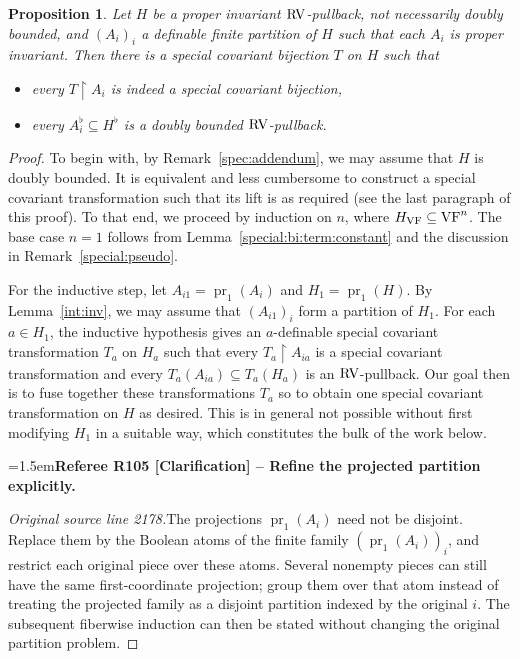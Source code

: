 \documentclass[12pt]{amsart}
\newcommand{\RefereeRemark}[4]{%
  \par\medskip\begingroup\normalfont\small\color{RefereePurple}%
  \emergencystretch=1.5em\noindent\textbf{Referee R#1 [#2] -- #3.}\par\nobreak\noindent #4\par
  \endgroup\medskip
}
\theoremstyle{plain}
\newtheorem{prop}[thm]{Proposition}
\theoremstyle{definition}
\theoremstyle{remark}
\numberwithin{equation}{section}
\theoremstyle{plain}
\newcommand{\VF}{\textup{VF}}
\newcommand{\RV}{\textup{RV}}
\DeclareMathOperator{\pr}{pr}
\newcommand{\0}{\emptyset}
\newcommand{\rest}{\upharpoonright}
\newcommand{\sub}{\subseteq}
\DeclareMathOperator{\rv}{rv}
\begin{document}
\begin{prop}\label{simplex:with:hole:rvproduct}
Let $H$ be a proper invariant $\RV$-pullback, not necessarily doubly bounded, and $(A_i)_i$ a definable finite partition of $H$ such that each $A_i$ is proper invariant. Then there is a special covariant bijection $T$ on $H$ such that
\begin{itemize}
  \item every $T \rest A_i$ is indeed a special covariant bijection,
  \item every $A_i^{\flat} \sub H^{\flat}$  is a doubly bounded $\RV$-pullback.
\end{itemize}
\end{prop}
\begin{proof}
To begin with, by Remark~\ref{spec:addendum}, we may assume that $H$ is doubly bounded. It is equivalent and less cumbersome to construct a special covariant transformation such that its lift is as required (see the last paragraph of this proof). To that end, we proceed by induction on $n$, where $H_{\VF} \sub \VF^n$. The base case $n=1$ follows from Lemma~\ref{special:bi:term:constant} and the discussion in Remark~\ref{special:pseudo}.


For the inductive step, let $A_{i1} = \pr_1(A_i)$ and $H_1 = \pr_1(H)$. By Lemma~\ref{int:inv}, we may assume that $(A_{i1})_i$ form a partition of $H_1$. For each $a \in H_1$, the inductive hypothesis gives an $a$-definable special covariant transformation $T_a$ on $H_a$ such that every $T_a \rest A_{ia}$ is a special covariant transformation and every $T_a(A_{ia}) \sub T_a(H_a)$ is an $\RV$-pullback. Our goal then is to fuse together these transformations $T_a$ so to obtain one special covariant transformation on $H$ as desired. This is in general not possible without first modifying $H_1$ in a suitable way, which constitutes the bulk of the work below.

\RefereeRemark{105}{Clarification}{Refine the projected partition explicitly}{%
\textit{Original source line 2178.}\quad The projections $\pr_1(A_i)$ need not be disjoint. Replace them by the Boolean atoms of the finite family $(\pr_1(A_i))_i$, and restrict each original piece over these atoms. Several nonempty pieces can still have the same first-coordinate projection; group them over that atom instead of treating the projected family as a disjoint partition indexed by the original $i$. The subsequent fiberwise induction can then be stated without changing the original partition problem.
}



\end{proof}
\end{document}

